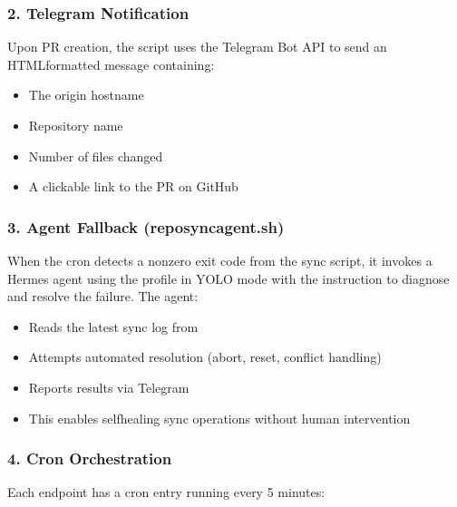 \documentclass[letterpaper,10pt,openany,oneside,english]{sphinxmanual}
\begin{document}
\subsubsection{2. Telegram Notification}
\label{\detokenize{proposed_solution:telegram-notification}}
\sphinxAtStartPar
Upon PR creation, the script uses the Telegram Bot API to send an HTML\sphinxhyphen{}formatted
message containing:
\begin{itemize}
\item {} 
\sphinxAtStartPar
The origin hostname

\item {} 
\sphinxAtStartPar
Repository name

\item {} 
\sphinxAtStartPar
Number of files changed

\item {} 
\sphinxAtStartPar
A clickable link to the PR on GitHub

\end{itemize}


\subsubsection{3. Agent Fallback (repo\sphinxhyphen{}sync\sphinxhyphen{}agent.sh)}
\label{\detokenize{proposed_solution:agent-fallback-repo-sync-agent-sh}}
\sphinxAtStartPar
When the cron detects a non\sphinxhyphen{}zero exit code from the sync script, it invokes
a Hermes agent using the  profile in YOLO mode with the instruction
to diagnose and resolve the failure. The agent:
\begin{itemize}
\item {} 
\sphinxAtStartPar
Reads the latest sync log from 

\item {} 
\sphinxAtStartPar
Attempts automated resolution (abort, reset, conflict handling)

\item {} 
\sphinxAtStartPar
Reports results via Telegram

\item {} 
\sphinxAtStartPar
This enables self\sphinxhyphen{}healing sync operations without human intervention

\end{itemize}


\subsubsection{4. Cron Orchestration}
\label{\detokenize{proposed_solution:cron-orchestration}}
\sphinxAtStartPar
Each endpoint has a cron entry running every 5 minutes:
\end{document}
